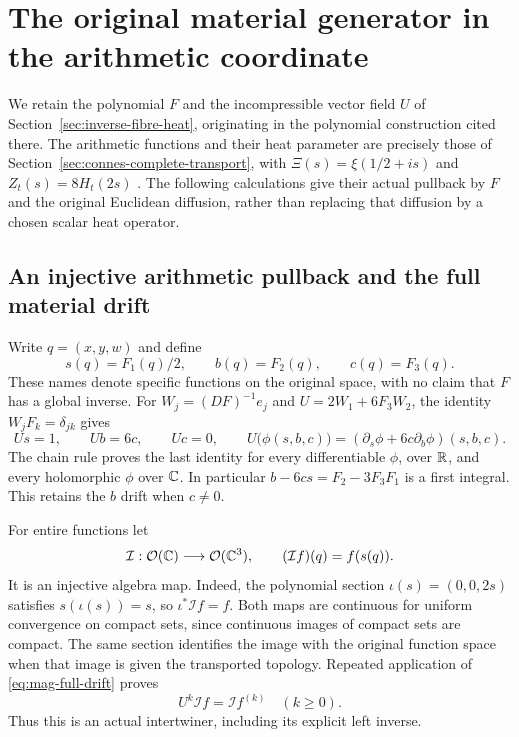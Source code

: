 \section{The original material generator in the arithmetic coordinate}
\label{sec:material-arithmetic-generator}

We retain the polynomial $F$ and the incompressible vector field $U$ of
Section~\ref{sec:inverse-fibre-heat}, originating in the polynomial
construction cited there\cite{tao2026jacobian,speyer2026jacobian,poplett2026alias}.
The arithmetic functions and their heat parameter are precisely those
of Section~\ref{sec:connes-complete-transport}, with
$\Xi(s)=\xi(1/2+is)$ and $Z_t(s)=8H_t(2s)$
\cite{ccmProlate2024,rodgersTao2020}.
The following calculations give their actual pullback by $F$ and the
original Euclidean diffusion, rather than replacing that diffusion by a
chosen scalar heat operator.

\subsection{An injective arithmetic pullback and the full material drift}

Write $q=(x,y,w)$ and define
\[
 s(q)=F_1(q)/2,\qquad b(q)=F_2(q),\qquad c(q)=F_3(q).
\]
These names denote specific functions on the original space, with no
claim that $F$ has a global inverse. For $W_j=(DF)^{-1}e_j$ and
$U=2W_1+6F_3W_2$, the identity $W_jF_k=\delta_{jk}$ gives
\begin{equation}
 Us=1,\qquad Ub=6c,\qquad Uc=0,\qquad
 U\bigl(\phi(s,b,c)\bigr)=(\partial_s\phi+6c\partial_b\phi)(s,b,c).
 \label{eq:mag-full-drift}
\end{equation}
The chain rule proves the last identity for every differentiable $\phi$,
over $\mathbb R$, and every holomorphic $\phi$ over $\mathbb C$. In particular
$b-6cs=F_2-3F_3F_1$ is a first integral. This retains the $b$ drift
when $c\ne0$.

For entire functions let
\[
 \mathcal I:\mathcal O(\mathbb C)\longrightarrow\mathcal O(\mathbb C^3),
 \qquad (\mathcal I f)(q)=f(s(q)).
\]
It is an injective algebra map. Indeed, the polynomial section
$\iota(s)=(0,0,2s)$ satisfies $s(\iota(s))=s$, so
$\iota^*\mathcal I f=f$. Both maps are continuous for uniform convergence
on compact sets, since continuous images of compact sets are compact.
The same section identifies the image with the original function
space when that image is given the transported topology. Repeated
application of \eqref{eq:mag-full-drift} proves
\begin{equation}
 U^k\mathcal I f=\mathcal I f^{(k)}\quad(k\ge0).
 \label{eq:mag-intertwiner}
\end{equation}
Thus this is an actual intertwiner, including its explicit left inverse.

